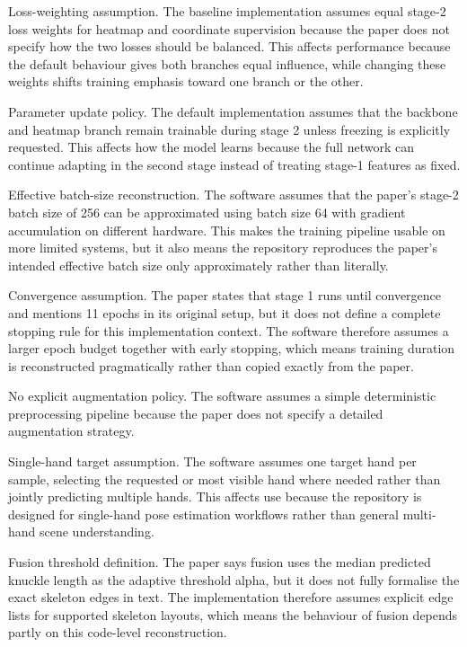 ﻿\documentclass[11pt,a4paper]{article}
\begin{document}
\medskip

Loss-weighting assumption. The baseline implementation assumes equal stage-2 loss weights for heatmap and coordinate supervision because the paper does not specify how the two losses should be balanced. This affects performance because the default behaviour gives both branches equal influence, while changing these weights shifts training emphasis toward one branch or the other.

\medskip

Parameter update policy. The default implementation assumes that the backbone and heatmap branch remain trainable during stage 2 unless freezing is explicitly requested. This affects how the model learns because the full network can continue adapting in the second stage instead of treating stage-1 features as fixed.

\medskip

Effective batch-size reconstruction. The software assumes that the paper's stage-2 batch size of 256 can be approximated using batch size 64 with gradient accumulation on different hardware. This makes the training pipeline usable on more limited systems, but it also means the repository reproduces the paper's intended effective batch size only approximately rather than literally.

\medskip

Convergence assumption. The paper states that stage 1 runs until convergence and mentions 11 epochs in its original setup, but it does not define a complete stopping rule for this implementation context. The software therefore assumes a larger epoch budget together with early stopping, which means training duration is reconstructed pragmatically rather than copied exactly from the paper.

\medskip

No explicit augmentation policy. The software assumes a simple deterministic preprocessing pipeline because the paper does not specify a detailed augmentation strategy.

\medskip

Single-hand target assumption. The software assumes one target hand per sample, selecting the requested or most visible hand where needed rather than jointly predicting multiple hands. This affects use because the repository is designed for single-hand pose estimation workflows rather than general multi-hand scene understanding.

\medskip

Fusion threshold definition. The paper says fusion uses the median predicted knuckle length as the adaptive threshold alpha, but it does not fully formalise the exact skeleton edges in text. The implementation therefore assumes explicit edge lists for supported skeleton layouts, which means the behaviour of fusion depends partly on this code-level reconstruction.
\end{document}
